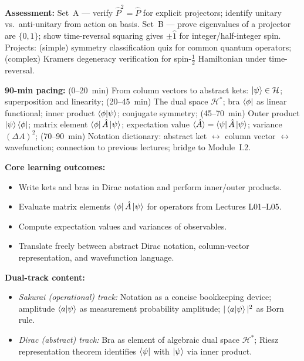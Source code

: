 \documentclass[11pt,a4paper]{article}
\begin{document}
\begin{tcolorbox}[modulebox, title={Module~I.1 / L05: Types of Symmetry Operators and Wigner's Theorem}]
\medskip\textbf{Assessment:}
Set~A --- verify $\hat{P}^2=\hat{P}$ for explicit projectors; identify unitary vs.\ anti-unitary from action on basis.
Set~B --- prove eigenvalues of a projector are $\{0,1\}$; show time-reversal squaring gives $\pm\hat{1}$ for integer/half-integer spin.
Projects: (simple) symmetry classification quiz for common quantum operators;
(complex) Kramers degeneracy verification for spin-$\tfrac{1}{2}$ Hamiltonian under time-reversal.
\end{tcolorbox}

\medskip

\begin{tcolorbox}[modulebox, title={Module~I.1 / L06: Bra-Ket Formalism (\S2.1--2.2)}]
\textbf{90-min pacing:} (0--20~min) From column vectors to abstract kets:
$\ket{\psi}\in\mathcal{H}$; superposition and linearity;
(20--45~min) The dual space $\mathcal{H}^*$; bra $\bra{\phi}$ as linear functional;
inner product $\braket{\phi|\psi}$; conjugate symmetry;
(45--70~min) Outer product $\ket{\psi}\bra{\phi}$; matrix element $\bra{\phi}\hat{A}\ket{\psi}$;
expectation value $\langle\hat{A}\rangle = \bra{\psi}\hat{A}\ket{\psi}$; variance $(\Delta A)^2$;
(70--90~min) Notation dictionary: abstract ket $\leftrightarrow$ column vector $\leftrightarrow$ wavefunction;
connection to previous lectures; bridge to Module~I.2.

\medskip\textbf{Core learning outcomes:}
\begin{itemize}[leftmargin=1.4em,topsep=2pt,itemsep=1pt]
  \item Write kets and bras in Dirac notation and perform inner/outer products.
  \item Evaluate matrix elements $\bra{\phi}\hat{A}\ket{\psi}$ for operators from Lectures L01--L05.
  \item Compute expectation values and variances of observables.
  \item Translate freely between abstract Dirac notation, column-vector representation, and wavefunction language.
\end{itemize}

\medskip\textbf{Dual-track content:}
\begin{itemize}[leftmargin=1.4em,topsep=2pt,itemsep=1pt]
  \item \textit{Sakurai (operational) track:} Notation as a concise bookkeeping device;
    amplitude $\braket{a|\psi}$ as measurement probability amplitude; $|\braket{a|\psi}|^2$ as Born rule.
  \item \textit{Dirac (abstract) track:} Bra as element of algebraic dual space $\mathcal{H}^*$;
    Riesz representation theorem identifies $\bra{\psi}$ with $\ket{\psi}$ via inner product.
\end{itemize}


\end{tcolorbox}
\end{document}
